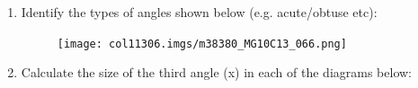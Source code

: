 \begin{table}[H]
\begin{enumerate}[noitemsep, label=\textbf{\arabic*}. ]
    




        
    


        

        \label{m38380*uid131}\item Identify the types of angles shown below (e.g. acute/obtuse etc):

          
    \setcounter{subfigure}{0}


	\begin{figure}[H] %
    \begin{center}
    \label{m38380*id401231!!!underscore!!!media}\label{m38380*id401231!!!underscore!!!printimage}\texttt{[image: col11306.imgs/m38380\_MG10C13\_066.png]} %
        
   
    
    \end{center}

 \end{figure}   

    \addtocounter{footnote}{-0}
    
        
\label{m38380*uid140}\item Calculate the size of the third angle (x) in each of the diagrams below:


\end{enumerate}
\end{table}
